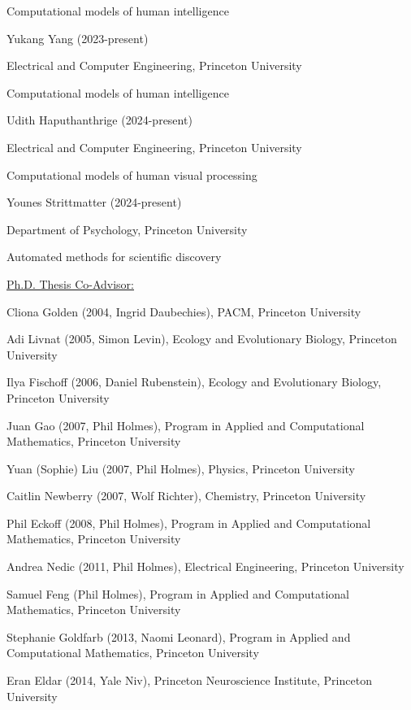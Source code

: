 \documentclass[10 pt]{article}
\begin{document}
Computational models of human intelligence
    \medskip

Yukang Yang (2023-present)

Electrical and Computer Engineering, Princeton University

Computational models of human intelligence
    \medskip


Udith Haputhanthrige (2024-present)

Electrical and Computer Engineering, Princeton University

Computational models of human visual processing
    \medskip

Younes Strittmatter (2024-present)

Department of Psychology, Princeton University

Automated methods for scientific discovery
    \medskip

{\fontsize{12pt}{16 pt}\selectfont \underline{Ph.D. Thesis Co-Advisor:}}
    \smallskip

Cliona Golden (2004, Ingrid Daubechies), PACM, Princeton University
    \smallskip

Adi Livnat (2005, Simon Levin), Ecology and Evolutionary Biology, Princeton University
    \smallskip

Ilya Fischoff (2006, Daniel Rubenstein), Ecology and Evolutionary Biology, Princeton University
    \smallskip

Juan Gao (2007, Phil Holmes), Program in Applied and Computational Mathematics, Princeton University
    \smallskip

Yuan (Sophie) Liu (2007, Phil Holmes), Physics, Princeton University
    \smallskip

Caitlin Newberry (2007, Wolf Richter), Chemistry, Princeton University
    \smallskip

Phil Eckoff (2008, Phil Holmes), Program in Applied and Computational Mathematics, Princeton University

Andrea Nedic (2011, Phil Holmes), Electrical Engineering, Princeton University
    \smallskip

Samuel Feng (Phil Holmes), Program in Applied and Computational Mathematics, Princeton University
    \smallskip

Stephanie Goldfarb (2013, Naomi Leonard), Program in Applied and Computational Mathematics, Princeton University
    \smallskip

Eran Eldar (2014, Yale Niv), Princeton Neuroscience Institute, Princeton University
    \smallskip
\end{document}
